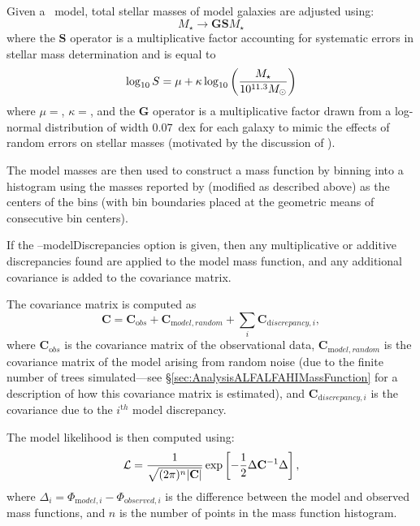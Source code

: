 Given a \glc\ model, total stellar masses of model galaxies are adjusted using:
\begin{equation}
 M_\star \rightarrow {\mathbf G} {\mathbf S} M_\star 
\end{equation}
where the ${\mathbf S}$ operator is a multiplicative factor accounting for systematic errors in stellar mass determination and is equal to \citep{behroozi_comprehensive_2010}
\begin{equation}
 \log_{\mathrm 10} S = \mu + \kappa \log_{\mathrm 10} \left({M_\star \over 10^{11.3}M_\odot}\right)
\end{equation}
where $\mu=${\normalfont {}}, $\kappa=${\normalfont {}}, and the {\normalfont \bfseries G} operator is a multiplicative factor drawn from a log-normal distribution of width $0.07$~dex for each galaxy to mimic the effects of random errors on stellar masses (motivated by the discussion of \cite{behroozi_comprehensive_2010}).

The model masses are then used to construct a mass function by binning into a histogram using the masses reported by \cite{li_distribution_2009} (modified as described above) as the centers of the bins (with bin boundaries placed at the geometric means of consecutive bin centers).

If the {\normalfont \ttfamily --modelDiscrepancies} option is given, then any multiplicative or additive discrepancies found are applied to the model mass function, and any additional covariance is added to the covariance matrix.

The covariance matrix is computed as
\begin{equation}
 {\mathbf C} = {\mathbf C}_{\mathrm obs} + {\mathbf C}_{\mathrm model,random} + \sum_i {\mathbf C}_{{\mathrm discrepancy}, i},
\end{equation}
where ${\mathbf C}_{\mathrm obs}$ is the covariance matrix of the observational data, ${\mathbf C}_{\mathrm model,random}$ is the covariance matrix of the model arising from random noise (due to the finite number of trees simulated---see \S\ref{sec:AnalysisALFALFAHIMassFunction} for a description of how this covariance matrix is estimated), and ${\mathbf C}_{{\mathrm discrepancy}, i}$ is the covariance due to the $i^{\mathrm th}$ model discrepancy.

The model likelihood is then computed using:
\begin{equation}
 \mathcal{L} = {1 \over \sqrt{(2 \pi)^n |{\mathbf C}|}} \exp\left[ -{1\over 2} \Delta {\mathbf C}^{-1} \Delta \right],
\end{equation}
where $\Delta_i = \Phi_{{\mathrm model}, i} - \Phi_{{\mathrm observed}, i}$ is the difference between the model and observed mass functions, and $n$ is the number of points in the mass function histogram.

